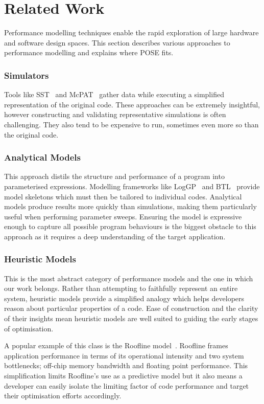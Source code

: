 \section{Related Work}
\label{sec:related}
Performance modelling techniques enable the rapid exploration of large hardware and software design spaces.
This section describes various approaches to performance modelling and explains where POSE fits.

\noindent
\subsubsection{Simulators} 
Tools like SST~\cite{rodrigues:2011aa} and McPAT~\cite{li:2009aa} gather data while executing a simplified representation of the original code.
These approaches can be extremely insightful, however constructing and validating representative simulations is often challenging.
They also tend to be expensive to run, sometimes even more so than the original code.

\subsubsection{Analytical Models} This approach distils the structure and performance of a program into parameterised expressions.
Modelling frameworks like LogGP~\cite{alexandrov:1997aa} and BTL~\cite{manousakis:2012aa} provide model skeletons which must then be tailored to individual codes.
Analytical models produce results more quickly than simulations, making them particularly useful when performing parameter sweeps.
Ensuring the model is expressive enough to capture all possible program behaviours is the biggest obstacle to this approach as it requires a deep understanding of the target application.

\subsubsection{Heuristic Models}
This is the most abstract category of performance models and the one in which our work belongs.
Rather than attempting to faithfully represent an entire system, heuristic models provide a simplified analogy which helps developers reason about particular properties of a code.
Ease of construction and the clarity of their insights mean heuristic models are well suited to guiding the early stages of optimisation.

A popular example of this class is the Roofline model~\cite{williams:2009aa}.
Roofline frames application performance in terms of its operational intensity and two system bottlenecks; off-chip memory bandwidth and floating point performance.
This simplification limits Roofline's use as a predictive model but it also means a developer can easily isolate the limiting factor of code performance and target their optimisation efforts accordingly.

